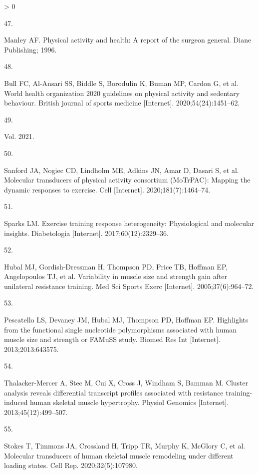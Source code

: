 \documentclass[twoside,10pt]{gihclass} %
\newlength{\cslhangindent}
\newlength{\csllabelwidth}
\newenvironment{CSLReferences}[3] %
 {%
  \setlength{\parindent}{0pt}
  \ifodd #1 \everypar{\setlength{\hangindent}{\cslhangindent}}\ignorespaces\fi
  \ifnum #2 > 0
  \setlength{\parskip}{#2\baselineskip}
  \fi
 }%
 {}
\newcommand{\CSLLeftMargin}[1]{\parbox[t]{\maxof{\widthof{#1}}{\csllabelwidth}}{#1}}
\newcommand{\CSLRightInline}[1]{\parbox[t]{\linewidth}{#1}}
\begin{document}
\begin{CSLReferences}{0}{0}
\leavevmode\hypertarget{ref-RN2666}{}%
\CSLLeftMargin{47. }
\CSLRightInline{Manley AF. Physical activity and health: A report of the surgeon general. Diane Publishing; 1996. }

\leavevmode\hypertarget{ref-RN2667}{}%
\CSLLeftMargin{48. }
\CSLRightInline{Bull FC, Al-Ansari SS, Biddle S, Borodulin K, Buman MP, Cardon G, et al. World health organization 2020 guidelines on physical activity and sedentary behaviour. British journal of sports medicine {[}Internet{]}. 2020;54(24):1451--62. }

\leavevmode\hypertarget{ref-RN2696}{}%
\CSLLeftMargin{49. }
\CSLRightInline{Vol. 2021. }

\leavevmode\hypertarget{ref-RN2678}{}%
\CSLLeftMargin{50. }
\CSLRightInline{Sanford JA, Nogiec CD, Lindholm ME, Adkins JN, Amar D, Dasari S, et al. Molecular transducers of physical activity consortium (MoTrPAC): Mapping the dynamic responses to exercise. Cell {[}Internet{]}. 2020;181(7):1464--74. }

\leavevmode\hypertarget{ref-RN2677}{}%
\CSLLeftMargin{51. }
\CSLRightInline{Sparks LM. Exercise training response heterogeneity: Physiological and molecular insights. Diabetologia {[}Internet{]}. 2017;60(12):2329--36. }

\leavevmode\hypertarget{ref-RN764}{}%
\CSLLeftMargin{52. }
\CSLRightInline{Hubal MJ, Gordish-Dressman H, Thompson PD, Price TB, Hoffman EP, Angelopoulos TJ, et al. Variability in muscle size and strength gain after unilateral resistance training. Med Sci Sports Exerc {[}Internet{]}. 2005;37(6):964--72. }

\leavevmode\hypertarget{ref-RN1263}{}%
\CSLLeftMargin{53. }
\CSLRightInline{Pescatello LS, Devaney JM, Hubal MJ, Thompson PD, Hoffman EP. Highlights from the functional single nucleotide polymorphisms associated with human muscle size and strength or FAMuSS study. Biomed Res Int {[}Internet{]}. 2013;2013:643575. }

\leavevmode\hypertarget{ref-RN826}{}%
\CSLLeftMargin{54. }
\CSLRightInline{Thalacker-Mercer A, Stec M, Cui X, Cross J, Windham S, Bamman M. Cluster analysis reveals differential transcript profiles associated with resistance training-induced human skeletal muscle hypertrophy. Physiol Genomics {[}Internet{]}. 2013;45(12):499--507. }

\leavevmode\hypertarget{ref-RN2684}{}%
\CSLLeftMargin{55. }
\CSLRightInline{Stokes T, Timmons JA, Crossland H, Tripp TR, Murphy K, McGlory C, et al. Molecular transducers of human skeletal muscle remodeling under different loading states. Cell Rep. 2020;32(5):107980. }


\end{CSLReferences}
\end{document}
